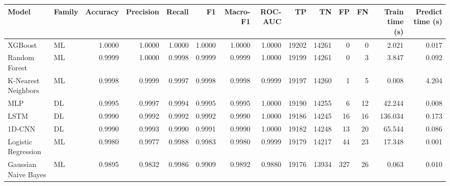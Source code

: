\begin{tabular}{llrrrrrrrrrrrr}
\toprule
Model & Family & Accuracy & Precision & Recall & F1 & Macro-F1 & ROC-AUC & TP & TN & FP & FN & Train time (s) & Predict time (s) \\
\midrule
XGBoost & ML & 1.0000 & 1.0000 & 1.0000 & 1.0000 & 1.0000 & 1.0000 & 19202 & 14261 & 0 & 0 & 2.021 & 0.017 \\
Random Forest & ML & 0.9999 & 1.0000 & 0.9998 & 0.9999 & 0.9999 & 1.0000 & 19199 & 14261 & 0 & 3 & 3.847 & 0.092 \\
K-Nearest Neighbors & ML & 0.9998 & 0.9999 & 0.9997 & 0.9998 & 0.9998 & 0.9999 & 19197 & 14260 & 1 & 5 & 0.008 & 4.204 \\
MLP & DL & 0.9995 & 0.9997 & 0.9994 & 0.9995 & 0.9995 & 1.0000 & 19190 & 14255 & 6 & 12 & 42.244 & 0.008 \\
LSTM & DL & 0.9990 & 0.9992 & 0.9992 & 0.9992 & 0.9990 & 1.0000 & 19186 & 14245 & 16 & 16 & 136.034 & 0.173 \\
1D-CNN & DL & 0.9990 & 0.9993 & 0.9990 & 0.9991 & 0.9990 & 1.0000 & 19182 & 14248 & 13 & 20 & 65.544 & 0.086 \\
Logistic Regression & ML & 0.9980 & 0.9977 & 0.9988 & 0.9983 & 0.9980 & 0.9999 & 19179 & 14217 & 44 & 23 & 17.348 & 0.001 \\
Gaussian Naive Bayes & ML & 0.9895 & 0.9832 & 0.9986 & 0.9909 & 0.9892 & 0.9880 & 19176 & 13934 & 327 & 26 & 0.063 & 0.010 \\
\bottomrule
\end{tabular}
